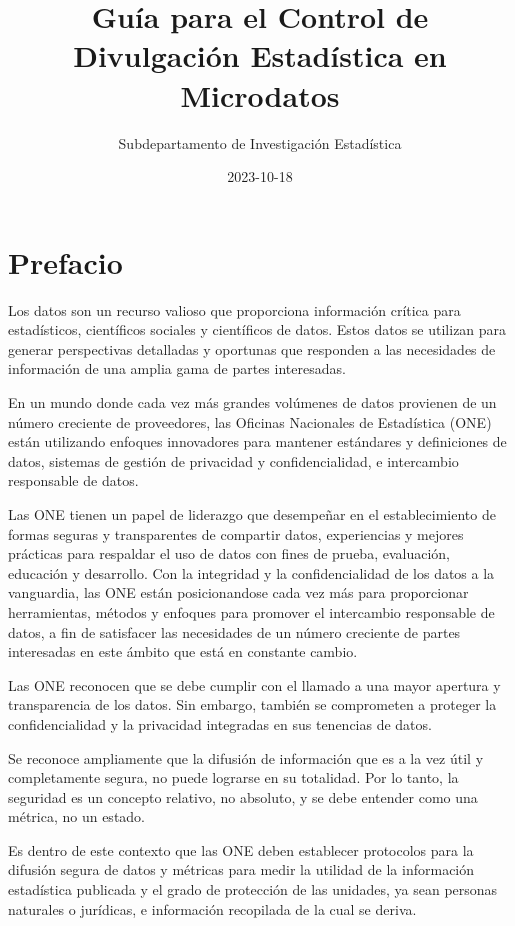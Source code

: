 \documentclass[
]{book}
\title{Guía para el Control de Divulgación Estadística en Microdatos}
\author{Subdepartamento de Investigación Estadística}
\date{2023-10-18}
\theoremstyle{definition}
\theoremstyle{definition}
\theoremstyle{definition}
\theoremstyle{definition}
\theoremstyle{remark}
\begin{document}
\maketitle

{
\hypersetup{linkcolor=}
\setcounter{tocdepth}{1}
\tableofcontents
}
\hypertarget{prefacio}{%
\chapter{Prefacio}\label{prefacio}}

Los datos son un recurso valioso que proporciona información crítica para estadísticos, científicos sociales y científicos de datos. Estos datos se utilizan para generar perspectivas detalladas y oportunas que responden a las necesidades de información de una amplia gama de partes interesadas.

En un mundo donde cada vez más grandes volúmenes de datos provienen de un número creciente de proveedores, las Oficinas Nacionales de Estadística (ONE) están utilizando enfoques innovadores para mantener estándares y definiciones de datos, sistemas de gestión de privacidad y confidencialidad, e intercambio responsable de datos.

Las ONE tienen un papel de liderazgo que desempeñar en el establecimiento de formas seguras y transparentes de compartir datos, experiencias y mejores prácticas para respaldar el uso de datos con fines de prueba, evaluación, educación y desarrollo. Con la integridad y la confidencialidad de los datos a la vanguardia, las ONE están posicionandose cada vez más para proporcionar herramientas, métodos y enfoques para promover el intercambio responsable de datos, a fin de satisfacer las necesidades de un número creciente de partes interesadas en este ámbito que está en constante cambio.

Las ONE reconocen que se debe cumplir con el llamado a una mayor apertura y transparencia de los datos. Sin embargo, también se comprometen a proteger la confidencialidad y la privacidad integradas en sus tenencias de datos.

Se reconoce ampliamente que la difusión de información que es a la vez útil y completamente segura, no puede lograrse en su totalidad. Por lo tanto, la seguridad es un concepto relativo, no absoluto, y se debe entender como una métrica, no un estado.

Es dentro de este contexto que las ONE deben establecer protocolos para la difusión segura de datos y métricas para medir la utilidad de la información estadística publicada y el grado de protección de las unidades, ya sean personas naturales o jurídicas, e información recopilada de la cual se deriva.
\end{document}
